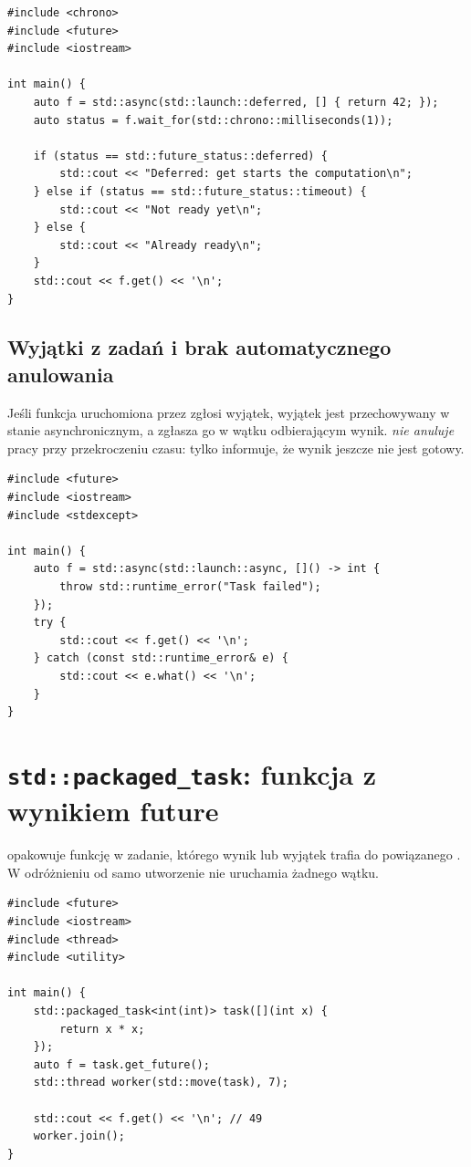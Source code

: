 \begin{lstlisting}[caption={Rozróżnianie statusów future (C++11).}]
#include <chrono>
#include <future>
#include <iostream>

int main() {
    auto f = std::async(std::launch::deferred, [] { return 42; });
    auto status = f.wait_for(std::chrono::milliseconds(1));

    if (status == std::future_status::deferred) {
        std::cout << "Deferred: get starts the computation\n";
    } else if (status == std::future_status::timeout) {
        std::cout << "Not ready yet\n";
    } else {
        std::cout << "Already ready\n";
    }
    std::cout << f.get() << '\n';
}
\end{lstlisting}

\subsection{Wyjątki z zadań i brak automatycznego anulowania}

Jeśli funkcja uruchomiona przez  zgłosi wyjątek,
wyjątek jest przechowywany w stanie asynchronicznym, a 
zgłasza go w wątku odbierającym wynik. 
\emph{nie anuluje} pracy przy przekroczeniu czasu: tylko informuje,
że wynik jeszcze nie jest gotowy.

\begin{lstlisting}[caption={Wyjątek z async zostaje przekazany przez get() (C++11).}]
#include <future>
#include <iostream>
#include <stdexcept>

int main() {
    auto f = std::async(std::launch::async, []() -> int {
        throw std::runtime_error("Task failed");
    });
    try {
        std::cout << f.get() << '\n';
    } catch (const std::runtime_error& e) {
        std::cout << e.what() << '\n';
    }
}
\end{lstlisting}

\section{\texttt{std::packaged\_task}: funkcja z wynikiem future}
\label{sec:packaged}

 opakowuje funkcję w zadanie,
którego wynik lub wyjątek trafia do powiązanego .
W odróżnieniu od  samo utworzenie
 nie uruchamia żadnego wątku.

\begin{lstlisting}[caption={Packaged task i ręcznie uruchomiony wątek (C++11).}]
#include <future>
#include <iostream>
#include <thread>
#include <utility>

int main() {
    std::packaged_task<int(int)> task([](int x) {
        return x * x;
    });
    auto f = task.get_future();
    std::thread worker(std::move(task), 7);

    std::cout << f.get() << '\n'; // 49
    worker.join();
}
\end{lstlisting}

